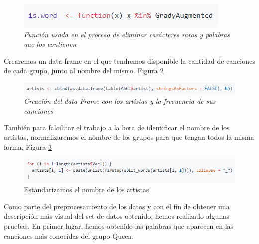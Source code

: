 \begin{figure}[h]
	\centering
	\includegraphics[width=0.8\linewidth]{Imagenes/isWord}
	\caption{\textit {Función usada en el proceso de eliminar carácteres raros y palabras que los contienen}}
	\label{fig:isWord}
\end{figure}

Crearemos un data frame en el que tendremos disponible la cantidad de canciones de cada grupo, junto al nombre del mismo. Figura \ref{fig:artistsDatframe}

\begin{figure}[h]
	\centering
	\includegraphics[width=0.9\linewidth]{Imagenes/artistsDatframe}
	\caption{\textit{Creación del data Frame con los artistas y la frecuencia de sus canciones}}
	\label{fig:artistsDatframe}
\end{figure}

También para falcilitar el trabajo a la hora de identificar el nombre de los artistas, normalizaremos el nombre de los grupos para que tengan todos la misma forma. Figura \ref{fig:artistsStand}

\begin{figure}[h]
	\centering
	\includegraphics[width=0.9\linewidth]{Imagenes/artistsStand}
	\caption{Estandarizamos el nombre de los artistas}
	\label{fig:artistsStand}
\end{figure}



Como parte del preprocesamiento de los datos y con el fin de obtener una descripción más visual del set de datos obtenido, hemos realizado algunas pruebas. En primer lugar, hemos obtenido las palabras que aparecen en las canciones más conocidas del grupo Queen.

